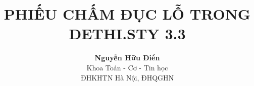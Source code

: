 \documentclass[12pt]{article}
\begin{document}
\title{\bf PHIẾU CHẤM ĐỤC LỖ TRONG DETHI.STY 3.3} %
\author{{\bf Nguyễn Hữu Điển}\\
Khoa Toán - Cơ - Tin học\\
ĐHKHTN Hà Nội, ĐHQGHN
} %
\date{} %

\maketitle
\vspace*{1cm}

\setlength{\baselineskip}{12truept}
\def\v#1{\overrightarrow{#1}} %

 \setlength{\shortitemwidth}{\textwidth/4-3em}
 \setlength{\runitemsep}{0pt}
 \setlength{\labelsep}{4pt}

\lamtieude
\indebai
\begin{enumerate}[]
\foreachproblem[bttracnghiem]{\item\causo\thisproblem}
\end{enumerate}
% 
\end{document}
